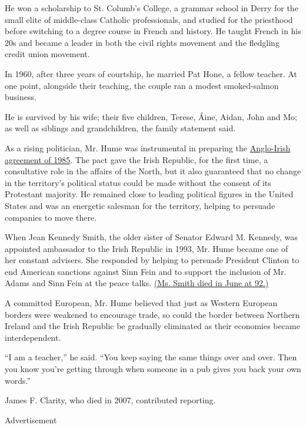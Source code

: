 He won a scholarship to St. Columb's College, a grammar school in Derry
for the small elite of middle-class Catholic professionals, and studied
for the priesthood before switching to a degree course in French and
history. He taught French in his 20s and became a leader in both the
civil rights movement and the fledgling credit union movement.

In 1960, after three years of courtship, he married Pat Hone, a fellow
teacher. At one point, alongside their teaching, the couple ran a modest
smoked-salmon business.

He is survived by his wife; their five children, Terese, Áine, Aidan,
John and Mo; as well as siblings and grandchildren, the family statement
said.

As a rising politician, Mr. Hume was instrumental in preparing the
\href{https://www.nytimes3xbfgragh.onion/1985/11/24/weekinreview/anglo-irish-agreement-pits-both-ends-against-the-middle.html}{Anglo-Irish
agreement of 1985}. The pact gave the Irish Republic, for the first
time, a consultative role in the affairs of the North, but it also
guaranteed that no change in the territory's political status could be
made without the consent of its Protestant majority. He remained close
to leading political figures in the United States and was an energetic
salesman for the territory, helping to persuade companies to move there.

When Jean Kennedy Smith, the older sister of Senator Edward M. Kennedy,
was appointed ambassador to the Irish Republic in 1993, Mr. Hume became
one of her constant advisers. She responded by helping to persuade
President Clinton to end American sanctions against Sinn Fein and to
support the inclusion of Mr. Adams and Sinn Fein at the peace talks.
\href{https://www.nytimes3xbfgragh.onion/2020/06/18/us/politics/jean-kennedy-smith-dead.html}{(Ms.
Smith died in June at 92.)}

A committed European, Mr. Hume believed that just as Western European
borders were weakened to encourage trade, so could the border between
Northern Ireland and the Irish Republic be gradually eliminated as their
economies became interdependent.

``I am a teacher,'' he said. ``You keep saying the same things over and
over. Then you know you're getting through when someone in a pub gives
you back your own words.''

James F. Clarity, who died in 2007, contributed reporting.

Advertisement

